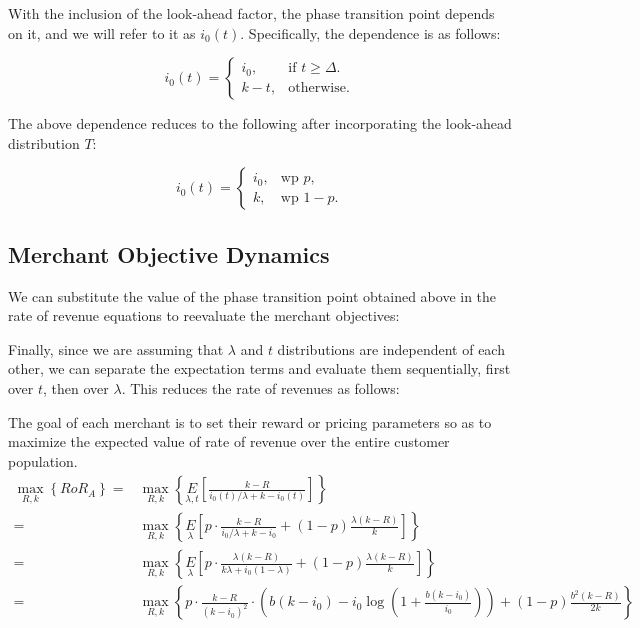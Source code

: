 With the inclusion of the look-ahead factor, the phase transition point depends on it, and we will refer to it as $i_0(t)$. Specifically, the dependence is as follows:

\begin{equation*}
  i_0(t)=\begin{cases}
    i_0, & \text{if $t \geq \Delta$}.\\
    k-t, & \text{otherwise}.
  \end{cases}
\end{equation*}

The above dependence reduces to the following after incorporating the look-ahead distribution $T$:

\begin{equation*}
  i_0(t)=\begin{cases}
    i_0, & \text{wp } p,\\
    k, & \text{wp } 1-p.
  \end{cases}
\end{equation*}



\subsection{Merchant Objective Dynamics}
We can substitute the value of the phase transition point obtained above in the rate of revenue equations to reevaluate the merchant objectives:


Finally, since we are assuming that $\lambda$ and $t$ distributions are independent of each other, we can separate the expectation terms and evaluate them sequentially, first over $t$, then over $\lambda$. This reduces the rate of revenues as follows:

The goal of each merchant is to set their reward or pricing parameters so as to maximize the expected value of rate of revenue over the entire customer population.
\begin{align*}
\underset{R,k}\max\left\{RoR_A\right\} =& \underset{R,k}\max\left\{\underset{\lambda, t}E\left[\frac{k-R}{i_0(t)/\lambda + k - i_0(t)}\right]\right\}\\
                                       =& \underset{R,k}\max\left\{\underset{\lambda}E\left[p\cdot\frac{k-R}{i_0/\lambda + k - i_0} + (1-p)\frac{\lambda(k-R)}{k}\right]\right\}\\
                                       =& \underset{R,k}\max\left\{\underset{\lambda}E\left[p\cdot\frac{\lambda(k-R)}{k\lambda + i_0(1-\lambda)} + (1-p)\frac{\lambda(k-R)}{k}\right]\right\}\\
                                       =& \underset{R,k}\max\left\{p\cdot\frac{k-R}{(k-i_0)^2}\cdot\left(b(k-i_0) - i_0 \log\left(1 + \frac{b(k-i_0)}{i_0}\right)\right) + (1-p)\frac{b^2(k-R)}{2k}\right\}
\end{align*}


